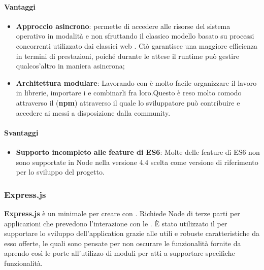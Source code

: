 \paragraph{Vantaggi} 
\begin{itemize}
\item \textbf{Approccio asincrono}:  permette di accedere alle risorse del sistema operativo in modalità  e non sfruttando il classico modello basato su processi concorrenti utilizzato dai classici web . Ciò garantisce una maggiore efficienza in termini di prestazioni, poiché durante le attese il runtime può gestire qualcos’altro in maniera asincrona;
\item \textbf{Architettura modulare}: Lavorando con  è molto facile organizzare il lavoro in librerie, importare i  e combinarli fra loro.Questo è reso molto comodo attraverso il  (\textbf{npm}) attraverso il quale lo sviluppatore può contribuire e accedere ai  messi a disposizione dalla community.
\end{itemize}

\paragraph{Svantaggi}
\begin{itemize}
\item \textbf{Supporto incompleto alle feature di ES6}: Molte delle feature di ES6 non
sono supportate in Node nella versione 4.4 scelta come versione di riferimento per
lo sviluppo del progetto.
\end{itemize}

	\subsubsection{Express.js}
\textbf{Express.js} è un  minimale per creare   con . Richiede  Node di terze parti per applicazioni che prevedono l'interazione con le .
È stato utilizzato il   per supportare lo sviluppo dell'application  grazie alle utili e robuste caratteristiche da esso offerte, le quali sono pensate per non oscurare le funzionalità fornite da  aprendo così le porte all'utilizzo di moduli per  atti a supportare specifiche funzionalità.

